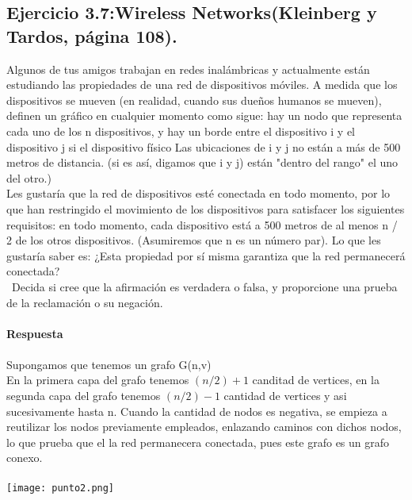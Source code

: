 \documentclass[a4paper,12pt]{article}
\begin{document}
\subsection{Ejercicio 3.7:Wireless Networks(Kleinberg y Tardos, página 108).}
Algunos de tus amigos trabajan en redes inalámbricas y actualmente están estudiando las propiedades de una red de dispositivos móviles. A medida que los dispositivos se mueven (en realidad, cuando sus dueños humanos se mueven), definen un gráfico en cualquier momento como sigue: hay un nodo que representa cada uno de los n dispositivos, y hay un borde entre el dispositivo i y el dispositivo j si el dispositivo físico Las ubicaciones de i y j no están a más de 500 metros de distancia. (si es así, digamos que i y j) están "dentro del rango" el uno del otro.)\\
Les gustaría que la red de dispositivos esté conectada en todo momento, por lo que han restringido el movimiento de los dispositivos para satisfacer los siguientes requisitos: en todo momento, cada dispositivo está a 500 metros de al menos n / 2 de los otros dispositivos. (Asumiremos que n es un número par). Lo que les gustaría saber es: ¿Esta propiedad por sí misma garantiza que la red permanecerá conectada?\\\
Decida si cree que la afirmación es verdadera o falsa, y proporcione una prueba de la reclamación o su negación.\\\\
\textbf{Respuesta}\\\\
Supongamos que tenemos un grafo G(n,v)\\
En la primera capa del grafo tenemos $(n/2)+1$ canditad de vertices, en la segunda capa del grafo tenemos $(n/2)-1$ cantidad de vertices y asi sucesivamente hasta n. Cuando la cantidad de nodos es negativa, se empieza a reutilizar los nodos previamente empleados, enlazando caminos con dichos nodos, lo que prueba que el la red permanecera conectada, pues este grafo es un grafo conexo.\\\\
\texttt{[image: punto2.png]}\\
\end{document}
